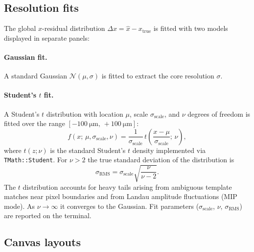 \documentclass[preprint,numbers,1p]{elsarticle}
\begin{document}
\subsection{Resolution fits}
\label{sec:fits}

The global $x$-residual distribution $\Delta x = \hat{x} - x_\mathrm{true}$ is fitted with
two models displayed in separate panels:

\paragraph{Gaussian fit.}
A standard Gaussian $\mathcal{N}(\mu,\sigma)$ is fitted to extract the core resolution
$\sigma$.

\paragraph{Student's $t$ fit.}
A Student's $t$ distribution with location $\mu$, scale $\sigma_\mathrm{scale}$, and
$\nu$ degrees of freedom is fitted over the range $[-\SI{100}{\micro\meter},\,+\SI{100}{\micro\meter}]$:
\begin{equation}
  f(x;\,\mu,\sigma_\mathrm{scale},\nu) =
  \frac{1}{\sigma_\mathrm{scale}}\,
  t\!\left(\frac{x-\mu}{\sigma_\mathrm{scale}};\,\nu\right),
\end{equation}
where $t(z;\nu)$ is the standard Student's $t$ density implemented via
\texttt{TMath::Student}. For $\nu > 2$ the true standard deviation of the distribution is
\begin{equation}
  \sigma_\mathrm{RMS} = \sigma_\mathrm{scale}\sqrt{\frac{\nu}{\nu-2}}.
\end{equation}
The $t$ distribution accounts for heavy tails arising from ambiguous template matches near
pixel boundaries and from Landau amplitude fluctuations (MIP mode). As $\nu\to\infty$ it
converges to the Gaussian. Fit parameters
($\sigma_\mathrm{scale}$, $\nu$, $\sigma_\mathrm{RMS}$) are reported on the terminal.

\subsection{Canvas layouts}
\label{sec:linearity}
\end{document}

